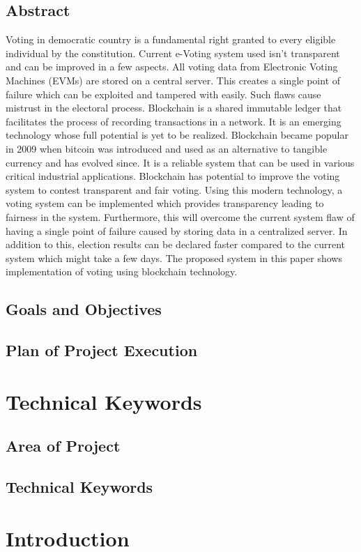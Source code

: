 \documentclass[a4paper, oneside, 12pt]{book}
\begin{document}
		\subsection{Abstract}
			Voting in democratic country is a fundamental right granted to every eligible individual by the constitution. Current e-Voting system used isn’t transparent and can be improved in a few aspects. All voting data from Electronic Voting Machines (EVMs) are stored on a central server. This creates a single point of failure which can be exploited and tampered with easily. Such flaws cause mistrust in the electoral process. Blockchain is a shared  immutable ledger that facilitates the process of recording transactions in a network. It is an emerging technology whose full potential is yet to be realized. Blockchain became popular in 2009 when bitcoin was introduced and used as an alternative to tangible currency and has evolved since. It is a reliable system that can be used in various critical industrial applications. Blockchain has potential to improve the voting system to contest transparent and fair voting. Using this modern technology, a voting system can be implemented which provides transparency leading to fairness in the system. Furthermore, this will overcome the current system flaw of having a single point of failure caused by storing data in a centralized server. In addition to this, election results can be declared faster compared to the current system which might take a few days. The proposed system in this paper shows implementation of voting using blockchain technology.
		\subsection{Goals and Objectives}
		\subsection{Plan of Project Execution}
	\newpage
	\section{Technical Keywords}
	\newpage
		\subsection{Area of Project}
		\subsection{Technical Keywords}
	\newpage
	\section{Introduction}
	\newpage
\end{document}
